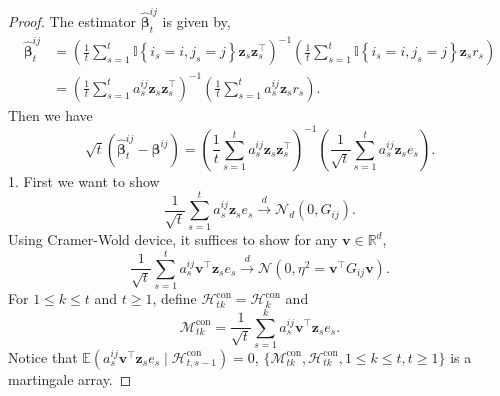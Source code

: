 \documentclass[12pt]{article}
\begin{document}
\begin{proof}
The estimator $\widehat{\bm{\beta}}_t^{ij}$ is given by,
\begin{align*}
    \widehat{\bm{\beta}}_t^{ij} &= \left(\frac{1}{t} \sum_{s=1}^{t} \mathbb{I}\left\{i_s=i,j_s=j \right\} \bm{z}_s \bm{z}_s^{\top}\right)^{-1} \left( \frac{1}{t} \sum_{s=1}^t \mathbb{I}\left\{i_s=i,j_s=j \right\} \bm{z}_s r_s \right) \\
    &= \left(\frac{1}{t} \sum_{s=1}^{t} a_s^{ij} \bm{z}_s \bm{z}_s^{\top}\right)^{-1} \left( \frac{1}{t} \sum_{s=1}^t a_s^{ij} \bm{z}_s r_s \right).
\end{align*}
Then we have
\begin{equation*}
    \sqrt{t}\left(\widehat{\bm{\beta}}_t^{ij} - \bm{\beta}^{ij}\right) = \left(\frac{1}{t} \sum_{s=1}^{t} a_s^{ij} \bm{z}_s \bm{z}_s^{\top}\right)^{-1} \left( \frac{1}{\sqrt{t}} \sum_{s=1}^t a_s^{ij} \bm{z}_s e_s \right).
\end{equation*}
1. First we want to show 
\[
\frac{1}{\sqrt{t}} \sum_{s=1}^t a_s^{ij} \bm{z}_s e_s \xrightarrow{d} \mathcal{N}_d(0, G_{ij}).
\]
Using Cramer-Wold device, it suffices to show for any $\bm{v} \in \mathbb{R}^d$,
\[
\frac{1}{\sqrt{t}} \sum_{s=1}^t a_s^{ij} \bm{v}^\top \bm{z}_s e_s \xrightarrow{d} \mathcal{N}(0, \eta^2 = \bm{v}^\top G_{ij} \bm{v}).
\]
For $1 \le k \le t$ and $t \ge 1$, define $\mathcal{H}^{\mathrm{con}}_{tk} = \mathcal{H}^{\mathrm{con}}_k$ and
\[
\mathcal M^{\mathrm{con}}_{tk} = \frac{1}{\sqrt{t}} \sum_{s=1}^k a_s^{ij} \bm{v}^\top \bm{z}_s e_s.
\]
Notice that $\mathbb{E}(a_s^{ij} \bm{v}^\top \bm{z}_s e_s \mid \mathcal{H}^{\mathrm{con}}_{t,s-1}) = 0$, $\{\mathcal M^{\mathrm{con}}_{tk}, \mathcal{H}^{\mathrm{con}}_{tk}, 1 \le k \le t, t \ge 1\}$ is a martingale array. 


\end{proof}
\end{document}
